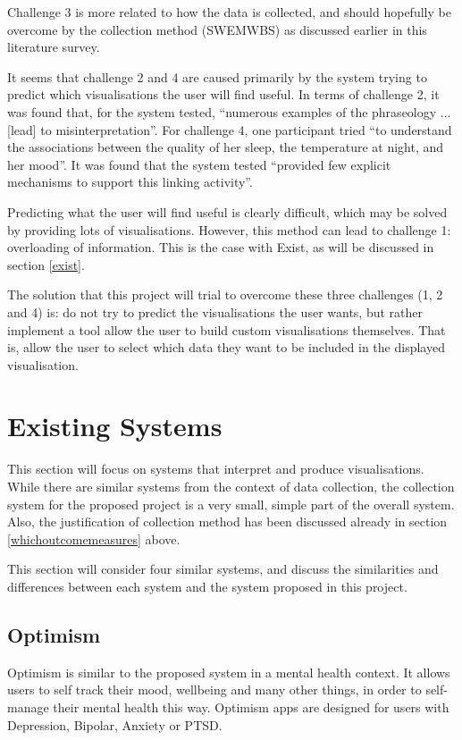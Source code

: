 \documentclass[11pt,openright,a4paper]{report}
\begin{document}
Challenge 3 is more related to how the data is collected, and should hopefully be overcome by the collection method (SWEMWBS) as discussed earlier in this literature survey.

It seems that challenge 2 and 4 are caused primarily by the system trying to predict which visualisations the user will find useful. In terms of challenge 2, it was found that, for the system tested, \enquote{numerous examples of the phraseology ... [lead] to misinterpretation}. For challenge 4, one participant tried \enquote{to understand the associations between the quality of her sleep, the temperature at night, and her mood}. It was found that the system tested \enquote{provided few explicit mechanisms to support this linking activity}.

Predicting what the user will find useful is clearly difficult, which may be solved by providing lots of visualisations. However, this method can lead to challenge 1: overloading of information. This is the case with Exist, as will be discussed in section \ref{exist}.

The solution that this project will trial to overcome these three challenges (1, 2 and 4) is: do not try to predict the visualisations the user wants, but rather implement a tool allow the user to build custom visualisations themselves. That is, allow the user to select which data they want to be included in the displayed visualisation.

\section{Existing Systems} \label{existingsystems}
This section will focus on systems that interpret and produce visualisations. While there are similar systems from the context of data collection, the collection system for the proposed project is a very small, simple part of the overall system. Also, the justification of collection method has been discussed already in section \ref{whichoutcomemeasures} above.

This section will consider four similar systems, and discuss the similarities and differences between each system and the system proposed in this project.

\subsection{Optimism}
Optimism \parencite{optimism} is similar to the proposed system in a mental health context. It allows users to self track their mood, wellbeing and many other things, in order to self-manage their mental health this way. Optimism apps are designed for users with Depression, Bipolar, Anxiety or PTSD.
\end{document}
